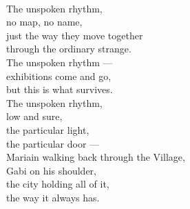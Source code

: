 \begin{lyrics}
\\
The unspoken rhythm,\\
no map, no name,\\
just the way they move together\\
through the ordinary strange.\\
The unspoken rhythm —\\
exhibitions come and go,\\
but this is what survives.\\
The unspoken rhythm,\\
low and sure,\\
the particular light,\\
the particular door —\\
Mariain walking back through the Village,\\
Gabi on his shoulder,\\
the city holding all of it,\\
the way it always has.

\end{lyrics}


